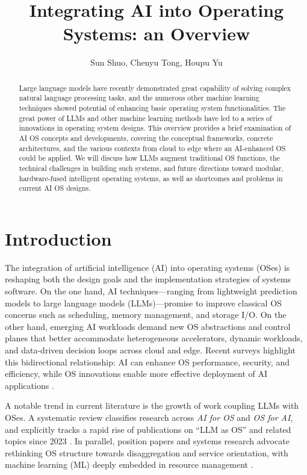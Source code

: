 \documentclass{article}
\title{Integrating AI into Operating Systems: an Overview}
\author{Sun Shuo, Chenyu Tong, Houpu Yu}
\begin{document}
\maketitle

\begin{abstract}
Large language models have recently demonstrated great capability of solving complex natural language processing
tasks, and the numerous other machine learning techniques showed potential of enhancing basic operating system 
functionalities. The great power of LLMs and other machine learning methods have led to a series of innovations 
in operating system designs. This overview provides a brief examination of AI OS concepts and developments, 
covering the conceptual frameworks, concrete architectures, and the various contexts from cloud to edge where an 
AI-enhanced OS could be applied. We will discuss how LLMs augment traditional OS functions, the technical challenges 
in building such systems, and future directions toward modular, hardware-fused intelligent operating systems, as well 
as shortcomes and problems in current AI OS designs.
\end{abstract}

\section{Introduction}
The integration of artificial intelligence (AI) into operating systems (OSes) is reshaping both the design goals and the implementation strategies of systems software. On the one hand, AI techniques—ranging from lightweight prediction models to large language models (LLMs)—promise to improve classical OS concerns such as scheduling, memory management, and storage I/O. On the other hand, emerging AI workloads demand new OS abstractions and control planes that better accommodate heterogeneous accelerators, dynamic workloads, and data-driven decision loops across cloud and edge. Recent surveys highlight this bidirectional relationship: AI can enhance OS performance, security, and efficiency, while OS innovations enable more effective deployment of AI applications \cite{zhang2024systematic}. %

A notable trend in current literature is the growth of work coupling LLMs with OSes. A systematic review classifies research across \emph{AI for OS} and \emph{OS for AI}, and explicitly tracks a rapid rise of publications on ``LLM as OS'' and related topics since 2023 \cite{zhang2024systematic}. %
In parallel, position papers and systems research advocate rethinking OS structure towards disaggregation and service orientation, with machine learning (ML) deeply embedded in resource management \cite{liu2021serviceos}. %
\end{document}
